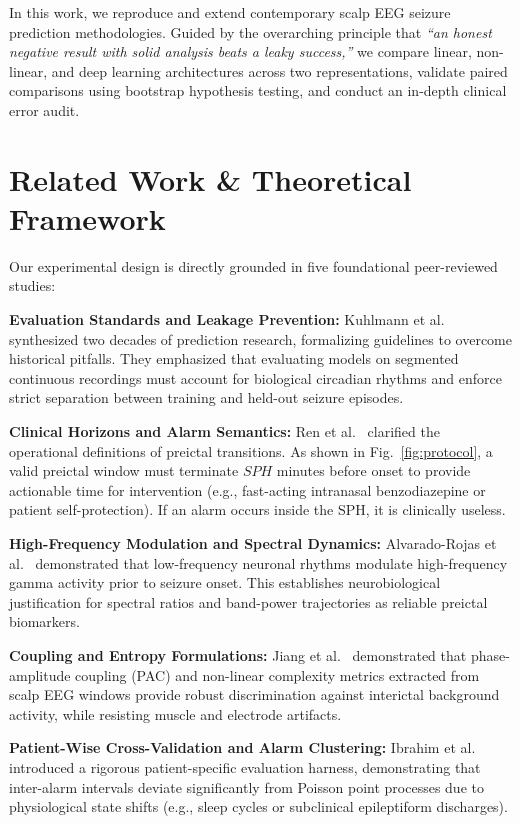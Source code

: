\documentclass[10pt,journal,compsoc]{IEEEtran}
\begin{document}
In this work, we reproduce and extend contemporary scalp EEG seizure prediction methodologies. Guided by the overarching principle that \emph{``an honest negative result with solid analysis beats a leaky success,''} we compare linear, non-linear, and deep learning architectures across two representations, validate paired comparisons using bootstrap hypothesis testing, and conduct an in-depth clinical error audit.

\section{Related Work \& Theoretical Framework}
Our experimental design is directly grounded in five foundational peer-reviewed studies:

\textbf{Evaluation Standards and Leakage Prevention:} Kuhlmann et al.~\cite{kuhlmann2018seizure} synthesized two decades of prediction research, formalizing guidelines to overcome historical pitfalls. They emphasized that evaluating models on segmented continuous recordings must account for biological circadian rhythms and enforce strict separation between training and held-out seizure episodes.

\textbf{Clinical Horizons and Alarm Semantics:} Ren et al.~\cite{ren2022preictal} clarified the operational definitions of preictal transitions. As shown in Fig.~\ref{fig:protocol}, a valid preictal window must terminate $SPH$ minutes before onset to provide actionable time for intervention (e.g., fast-acting intranasal benzodiazepine or patient self-protection). If an alarm occurs inside the SPH, it is clinically useless.

\textbf{High-Frequency Modulation and Spectral Dynamics:} Alvarado-Rojas et al.~\cite{alvaradorojas2014high} demonstrated that low-frequency neuronal rhythms modulate high-frequency gamma activity prior to seizure onset. This establishes neurobiological justification for spectral ratios and band-power trajectories as reliable preictal biomarkers.

\textbf{Coupling and Entropy Formulations:} Jiang et al.~\cite{jiang2023phase} demonstrated that phase-amplitude coupling (PAC) and non-linear complexity metrics extracted from scalp EEG windows provide robust discrimination against interictal background activity, while resisting muscle and electrode artifacts.

\textbf{Patient-Wise Cross-Validation and Alarm Clustering:} Ibrahim et al.~\cite{ibrahim2023patient} introduced a rigorous patient-specific evaluation harness, demonstrating that inter-alarm intervals deviate significantly from Poisson point processes due to physiological state shifts (e.g., sleep cycles or subclinical epileptiform discharges).
\end{document}
